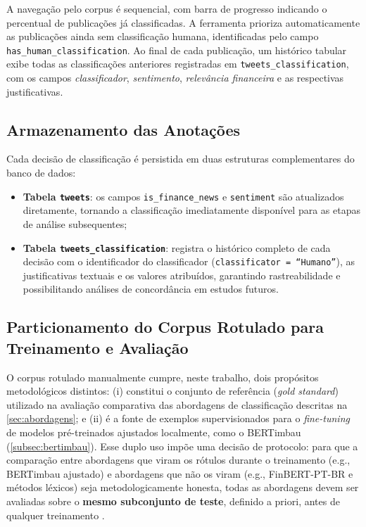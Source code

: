 A navegação pelo corpus é sequencial, com barra de progresso indicando o percentual de publicações já classificadas. A ferramenta prioriza automaticamente as publicações ainda sem classificação
humana, identificadas pelo campo \texttt{has\_human\_classification}. Ao final de cada publicação, um histórico tabular exibe todas as classificações anteriores registradas em \texttt{tweets\_classification}, com os campos \textit{classificador}, \textit{sentimento}, \textit{relevância financeira} e as respectivas justificativas.

\subsection{Armazenamento das Anotações}
\label{subsec:armazenamento_anotacoes}

Cada decisão de classificação é persistida em duas estruturas complementares do banco de dados:

\begin{itemize}
	\item \textbf{Tabela \texttt{tweets}}: os campos \texttt{is\_finance\_news} e \texttt{sentiment} são atualizados diretamente, tornando a classificação imediatamente disponível para as etapas de análise subsequentes;
	
	\item \textbf{Tabela \texttt{tweets\_classification}}: registra o histórico completo de cada decisão com o identificador do classificador (\texttt{classificator = ``Humano''}), as justificativas textuais e os valores atribuídos, garantindo rastreabilidade e possibilitando análises de concordância em estudos futuros.
\end{itemize}


\subsection{Particionamento do Corpus Rotulado para Treinamento e Avaliação}
\label{subsec:particionamento}

O corpus rotulado manualmente cumpre, neste trabalho, dois propósitos metodológicos distintos: (i) constitui o conjunto de referência (\textit{gold standard}) utilizado na avaliação comparativa das abordagens de classificação descritas na \autoref{sec:abordagens}; e (ii) é a fonte de exemplos supervisionados para o \textit{fine-tuning} de modelos pré-treinados ajustados localmente, como o BERTimbau (\autoref{subsec:bertimbau}). Esse duplo uso impõe uma decisão de protocolo: para que a comparação entre abordagens que viram os rótulos durante o treinamento (e.g., BERTimbau ajustado) e abordagens que não os viram (e.g., FinBERT-PT-BR e métodos léxicos) seja metodologicamente honesta, todas as abordagens devem ser avaliadas sobre o \textbf{mesmo subconjunto de teste}, definido a priori, antes de qualquer treinamento \cite{jurafsky2026,caseli2024cap1}.

